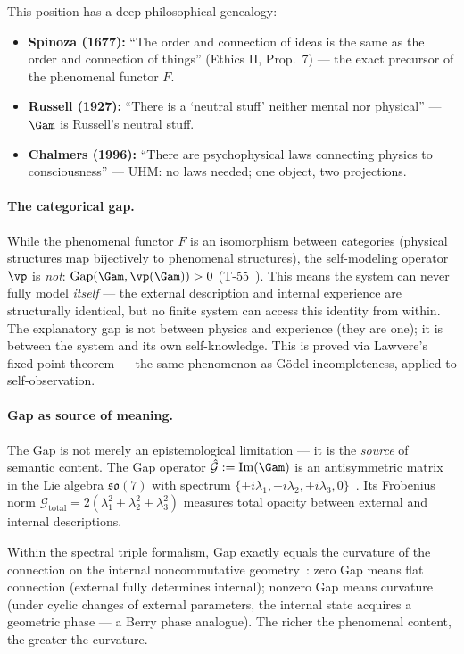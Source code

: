 This position has a deep philosophical genealogy:
\begin{itemize}[leftmargin=2em]
  \item \textbf{Spinoza (1677):} ``The order and connection of ideas is the same as the
        order and connection of things'' (Ethics II, Prop.~7) --- the exact precursor of
        the phenomenal functor $F$.
  \item \textbf{Russell (1927):} ``There is a `neutral stuff' neither mental nor physical''
        --- $\Gam$ is Russell's neutral stuff.
  \item \textbf{Chalmers (1996):} ``There are psychophysical laws connecting physics to
        consciousness'' --- UHM: no laws needed; one object, two projections.
\end{itemize}

\paragraph{The categorical gap.}
While the phenomenal functor $F$ is an isomorphism between categories (physical structures
map bijectively to phenomenal structures), the self-modeling operator $\vp$ is \emph{not}:
$\mathrm{Gap}(\Gam, \vp(\Gam)) > 0$ (T-55~). This means the system can never
fully model \emph{itself} --- the external description and internal experience are
structurally identical, but no finite system can access this identity from within.
The explanatory gap is not between physics and experience (they are one); it is between
the system and its own self-knowledge. This is proved via Lawvere's fixed-point
theorem --- the same phenomenon as G\"{o}del incompleteness, applied to self-observation.

\paragraph{Gap as source of meaning.}
The Gap is not merely an epistemological limitation --- it is the \emph{source} of
semantic content. The Gap operator $\hat{\mathcal{G}} := \mathrm{Im}(\Gam)$ is an
antisymmetric matrix in the Lie algebra $\mathfrak{so}(7)$ with spectrum
$\{\pm i\lambda_1, \pm i\lambda_2, \pm i\lambda_3, 0\}$~. Its Frobenius
norm $\mathcal{G}_{\mathrm{total}} = 2(\lambda_1^2 + \lambda_2^2 + \lambda_3^2)$
measures total opacity between external and internal descriptions.

Within the spectral triple formalism, Gap exactly equals the curvature of the connection
on the internal noncommutative geometry~: zero Gap means flat connection
(external fully determines internal); nonzero Gap means curvature (under cyclic changes
of external parameters, the internal state acquires a geometric phase --- a Berry phase
analogue). The richer the phenomenal content, the greater the curvature.

